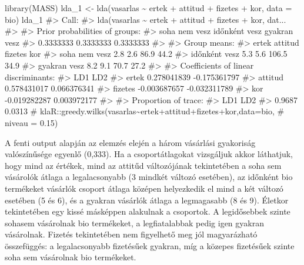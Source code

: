 \documentclass[
  letterpaper,
]{krantz}
\makeatletter
\newenvironment{Shaded}{\begin{snugshade}}{\end{snugshade}}
\newcommand{\AttributeTok}[1]{\textcolor[rgb]{0.40,0.45,0.13}{#1}}
\newcommand{\CommentTok}[1]{\textcolor[rgb]{0.37,0.37,0.37}{#1}}
\newcommand{\FunctionTok}[1]{\textcolor[rgb]{0.28,0.35,0.67}{#1}}
\newcommand{\NormalTok}[1]{\textcolor[rgb]{0.00,0.23,0.31}{#1}}
\newcommand{\OtherTok}[1]{\textcolor[rgb]{0.00,0.23,0.31}{#1}}
\newcommand{\SpecialCharTok}[1]{\textcolor[rgb]{0.37,0.37,0.37}{#1}}
\newenvironment{kframe}{%
\medskip{}
\setlength{\fboxsep}{.8em}
 \def\at@end@of@kframe{}%
 \ifinner\ifhmode%
  \def\at@end@of@kframe{\end{minipage}}%
  \begin{minipage}{\columnwidth}%
 \fi\fi%
 \def\FrameCommand##1{\hskip\@totalleftmargin \hskip-\fboxsep
 \colorbox{shadecolor}{##1}\hskip-\fboxsep
     \hskip-\linewidth \hskip-\@totalleftmargin \hskip\columnwidth}%
 \MakeFramed {\advance\hsize-\width
   \@totalleftmargin\z@ \linewidth\hsize
   \@setminipage}}%
 {\par\unskip\endMakeFramed%
 \at@end@of@kframe}
\renewenvironment{Shaded}{\begin{kframe}}{\end{kframe}}
\makeatother
\begin{document}
\begin{Shaded}
\begin{Highlighting}[]
\FunctionTok{library}\NormalTok{(MASS)}
\NormalTok{lda\_1 }\OtherTok{\textless{}{-}} \FunctionTok{lda}\NormalTok{(vasarlas }\SpecialCharTok{\textasciitilde{}}\NormalTok{ ertek }\SpecialCharTok{+}\NormalTok{ attitud }\SpecialCharTok{+}\NormalTok{ fizetes }\SpecialCharTok{+}\NormalTok{ kor, }\AttributeTok{data =}\NormalTok{ bio)}
\NormalTok{lda\_1}
\CommentTok{\#\textgreater{} Call:}
\CommentTok{\#\textgreater{} lda(vasarlas \textasciitilde{} ertek + attitud + fizetes + kor, dat...}
\CommentTok{\#\textgreater{} }
\CommentTok{\#\textgreater{} Prior probabilities of groups:}
\CommentTok{\#\textgreater{} soha nem vesz időnként vesz  gyakran vesz }
\CommentTok{\#\textgreater{}     0.3333333     0.3333333     0.3333333 }
\CommentTok{\#\textgreater{} }
\CommentTok{\#\textgreater{} Group means:}
\CommentTok{\#\textgreater{}               ertek attitud fizetes  kor}
\CommentTok{\#\textgreater{} soha nem vesz   2.8     2.6    86.9 44.2}
\CommentTok{\#\textgreater{} időnként vesz   5.3     5.6   106.5 34.9}
\CommentTok{\#\textgreater{} gyakran vesz    8.2     9.1    70.7 27.2}
\CommentTok{\#\textgreater{} }
\CommentTok{\#\textgreater{} Coefficients of linear discriminants:}
\CommentTok{\#\textgreater{}                  LD1          LD2}
\CommentTok{\#\textgreater{} ertek    0.278041839 {-}0.175361797}
\CommentTok{\#\textgreater{} attitud  0.578431017  0.066376341}
\CommentTok{\#\textgreater{} fizetes {-}0.003687657 {-}0.032311789}
\CommentTok{\#\textgreater{} kor     {-}0.019282287  0.003972177}
\CommentTok{\#\textgreater{} }
\CommentTok{\#\textgreater{} Proportion of trace:}
\CommentTok{\#\textgreater{}    LD1    LD2 }
\CommentTok{\#\textgreater{} 0.9687 0.0313}
\CommentTok{\# klaR::greedy.wilks(vasarlas\textasciitilde{}ertek+attitud+fizetes+kor,data=bio,}
\CommentTok{\# niveau = 0.15)}
\end{Highlighting}
\end{Shaded}

A fenti output alapján az elemzés elején a három vásárlási gyakoriság
valószínűsége egyenlő (0,333). Ha a csoportátlagokat vizsgáljuk akkor
láthatjuk, hogy mind az értékek, mind az attitűd változójának
tekintetében a soha sem vásárolók átlaga a legalacsonyabb (3 mindkét
változó esetében), az időnként bio termékeket vásárlók csoport átlaga
középen helyezkedik el mind a két változó esetében (5 és 6), és a
gyakran vásárlók átlaga a legmagasabb (8 és 9). Életkor tekintetében egy
kissé másképpen alakulnak a csoportok. A legidősebbek szinte sohasem
vásárolnak bio termékeket, a legfiatalabbak pedig igen gyakran
vásárolnak. Fizetés tekintetében nem figyelhető meg jól magyarázható
összefüggés: a legalacsonyabb fizetésűek gyakran, míg a közepes
fizetésűek szinte soha sem vásárolnak bio termékeket.
\end{document}
